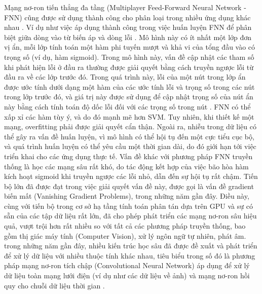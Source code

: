 \documentclass[utf8]{frontiersSCNS} %
\begin{document}
Mạng nơ-ron tiến thẳng đa tầng (Multiplayer Feed-Forward Neural Network - FNN) cũng được sử dụng thành công cho phân loại trong nhiều ứng dụng khác nhau \citep{Zhang2000}. Ví dụ như việc áp dụng thành công trong việc huấn luyện FNN để phân biệt giữa dòng vào từ biến áp và dòng lỗi \citep{Perez1994}. Mô hình này có ít nhất một lớp đơn vị ẩn, mỗi lớp tính toán một hàm phi tuyến mượt và khả vi của tổng đầu vào có trọng số (ví dụ, hàm sigmoid). Trong mô hình này, vấn đề cập nhật các tham số khi phát hiện lỗi ở đầu ra thường được giải quyết bằng cách truyền ngược lỗi từ đầu ra về các lớp trước đó. Trong quá trình này, lỗi của một nút trong lớp ẩn được ước tính dưới dạng một hàm của các ước tính lỗi và trọng số trong các nút trong lớp trước đó, và giá trị này được sử dụng để cập nhật trọng số của nút ẩn này bằng cách tính toán độ dốc lỗi đối với các trọng số trong nút \citep{Werbos1994}. FNN có thể xấp xỉ các hàm tùy ý, và do đó mạnh mẽ hơn SVM. Tuy nhiên, khi thiết kế một mạng, overfitting phải được giải quyết cẩn thận. Ngoài ra, nhiễu trong dữ liệu có thể gây ra vấn đề huấn luyện, vì mô hình có thể hội tụ đến một cực tiểu cục bộ, và quá trình huấn luyện có thể yêu cầu một thời gian dài, do đó giới hạn tới việc triển khai cho các ứng dụng thực tế. Vấn đề khác với phương pháp FNN truyền thống là học các mạng sâu rất khó, do tác động kết hợp của việc bão hòa hàm kích hoạt sigmoid khi truyền ngược các lỗi nhỏ, dẫn đến sự hội tụ rất chậm. Tiến bộ lớn đã được đạt trong việc giải quyết vấn đề này, được gọi là vấn đề gradient biến mất (Vanishing Gradient Problems), trong những năm gần đây. Điều này, cùng với tiến bộ trong cơ sở hạ tầng tính toán phân tán dựa trên GPU và sự có sẵn của các tập dữ liệu rất lớn, đã cho phép phát triển các mạng nơ-ron sâu hiệu quả, vượt trội hơn rất nhiều so với tất cả các phương pháp truyền thống, bao gồm thị giác máy tính (Computer Vision), xử lý ngôn ngữ tự nhiên, phát âm. trong những năm gần đây, nhiều kiến trúc học sâu đã được đề xuất và phát triển để xử lý dữ liệu với nhiều thuộc tính khác nhau, tiêu biểu trong số đó là phương pháp mạng nơ-ron tích chập (Convolutional Neural Network) áp dụng để xử lý dữ liệu toàn mạng lưới điện (ví dụ như các dữ liệu về ảnh) và mạng nơ-ron hồi quy cho chuỗi dữ liệu thời gian \citep{Werbos1994, LeCun2015}.

\end{document}
